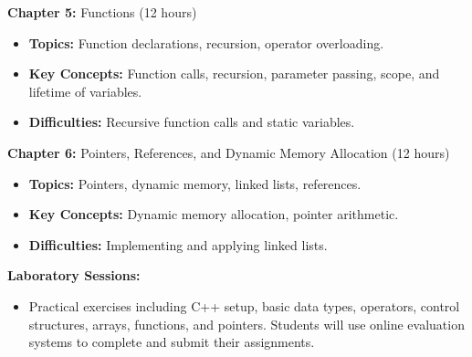 \textbf{Chapter 5:} Functions (12 hours) 
\begin{itemize}[topsep=0pt, partopsep=0pt, parsep=0pt, itemsep=1pt]
    \item \textbf{Topics:} Function declarations, recursion, operator overloading. 
    \item \textbf{Key Concepts:} Function calls, recursion, parameter passing, scope, and lifetime of variables. 
    \item \textbf{Difficulties:} Recursive function calls and static variables.
\end{itemize}
    
\textbf{Chapter 6:} Pointers, References, and Dynamic Memory Allocation (12 hours) 
\begin{itemize}[topsep=0pt, partopsep=0pt, parsep=0pt, itemsep=1pt]
    \item \textbf{Topics:} Pointers, dynamic memory, linked lists, references. 
    \item \textbf{Key Concepts:} Dynamic memory allocation, pointer arithmetic. 
    \item \textbf{Difficulties:} Implementing and applying linked lists.
\end{itemize}

\textbf{Laboratory Sessions:} 
\begin{itemize}[topsep=0pt, partopsep=0pt, parsep=0pt, itemsep=1pt]
    \item Practical exercises including C++ setup, basic data types, operators, control structures, arrays, functions, and pointers. Students will use online evaluation systems to complete and submit their assignments.
\end{itemize}

